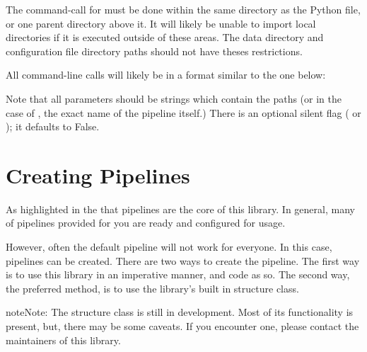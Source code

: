 \documentclass[letterpaper,10pt,english]{sphinxmanual}
\begin{document}
The command-call for  must be done within the same
directory as the Python file, or one parent directory above it. It will
likely be unable to import local directories if it is executed outside of
these areas. The data directory and configuration file directory paths
should not have theses restrictions.

All command-line calls will likely be in a format similar to the one below:

\begin{sphinxVerbatim}[commandchars=\\\{\}]
    
\end{sphinxVerbatim}

Note that all parameters should be strings which contain the paths (or in the
case of , the exact name of the pipeline itself.) There is
an optional silent flag ( or ); it defaults to False.


\chapter{Creating Pipelines}
\label{\detokenize{creating_pipelines:creating-pipelines}}\label{\detokenize{creating_pipelines::doc}}
As highlighted in the {\hyperref[\detokenize{quickstart::doc}]{}} that pipelines
are the core of this library. In general, many of pipelines provided for
you are ready and configured for usage.

However, often the default pipeline will not work for everyone. In this
case, pipelines can be created. There are two ways to create the pipeline.
The first way is to use this library in an imperative manner, and code
as so. The second way, the preferred method, is to use the library’s built
in structure class.

\begin{sphinxadmonition}{note}{Note:}
The structure class is still in development. Most of its
functionality is present, but, there may be some caveats. If you
encounter one, please contact the maintainers of this library.
\end{sphinxadmonition}
\end{document}
